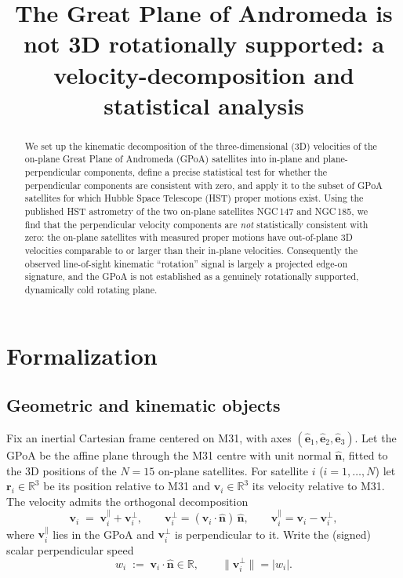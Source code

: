 \documentclass{amsart}
\theoremstyle{definition}
\begin{document}
\title{The Great Plane of Andromeda is not 3D rotationally supported: a
velocity-decomposition and statistical analysis}
\maketitle

\begin{abstract}
We set up the kinematic decomposition of the three-dimensional (3D)
velocities of the on-plane Great Plane of Andromeda (GPoA) satellites into
in-plane and plane-perpendicular components, define a precise statistical
test for whether the perpendicular components are consistent with zero, and
apply it to the subset of GPoA satellites for which Hubble Space Telescope
(HST) proper motions exist. Using the published HST astrometry of the two
on-plane satellites NGC\,147 and NGC\,185, we find that the perpendicular
velocity components are \emph{not} statistically consistent with zero: the
on-plane satellites with measured proper motions have out-of-plane 3D
velocities comparable to or larger than their in-plane velocities.
Consequently the observed line-of-sight kinematic ``rotation'' signal is
largely a projected edge-on signature, and the GPoA is not established as a
genuinely rotationally supported, dynamically cold rotating plane.
\end{abstract}

\section{Formalization}

\subsection{Geometric and kinematic objects}
Fix an inertial Cartesian frame centered on M31, with axes
$(\hat{\bm e}_1,\hat{\bm e}_2,\hat{\bm e}_3)$. Let the GPoA be the affine
plane through the M31 centre with unit normal $\hat{\bm n}$, fitted to the
3D positions of the $N=15$ on-plane satellites. For satellite $i$
($i=1,\dots,N$) let $\bm r_i\in\mathbb R^3$ be its position relative to M31
and $\bm v_i\in\mathbb R^3$ its velocity relative to M31. The velocity admits
the orthogonal decomposition
\begin{equation}\label{eq:decomp}
  \bm v_i \;=\; \bm v_i^{\parallel} + \bm v_i^{\perp},
  \qquad
  \bm v_i^{\perp} = (\bm v_i\cdot\hat{\bm n})\,\hat{\bm n},
  \qquad
  \bm v_i^{\parallel} = \bm v_i - \bm v_i^{\perp},
\end{equation}
where $\bm v_i^{\parallel}$ lies in the GPoA and $\bm v_i^{\perp}$ is
perpendicular to it. Write the (signed) scalar perpendicular speed
\begin{equation}\label{eq:wperp}
  w_i \;:=\; \bm v_i\cdot\hat{\bm n} \in\mathbb R,
  \qquad
  \|\bm v_i^{\perp}\| = |w_i|.
\end{equation}
\end{document}

